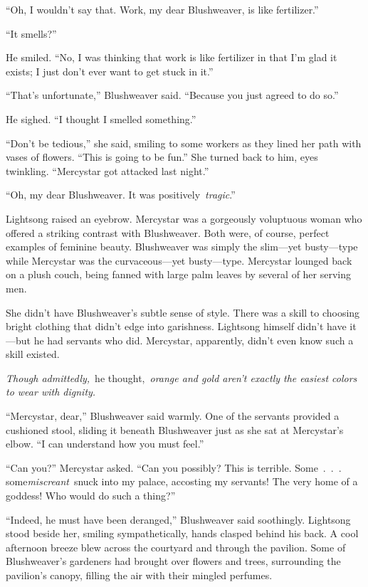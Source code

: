 “Oh, I wouldn’t say that. Work, my dear Blushweaver, is like fertilizer.”

“It smells?”

He smiled. “No, I was thinking that work is like fertilizer in that I’m glad it exists; I just don’t ever want to get stuck in it.”

“That’s unfortunate,” Blushweaver said. “Because you just agreed to do so.”

He sighed. “I thought I smelled something.”

“Don’t be tedious,” she said, smiling to some workers as they lined her path with vases of flowers. “This is going to be fun.” She turned back to him, eyes twinkling. “Mercystar got attacked last night.”

\orn

“Oh, my dear Blushweaver. It was positively~\textit{tragic}.”

Lightsong raised an eyebrow. Mercystar was a gorgeously voluptuous woman who offered a striking contrast with Blushweaver. Both were, of course, perfect examples of feminine beauty. Blushweaver was simply the slim—yet busty—type while Mercystar was the curvaceous—yet busty—type. Mercystar lounged back on a plush couch, being fanned with large palm leaves by several of her serving men.

She didn’t have Blushweaver’s subtle sense of style. There was a skill to choosing bright clothing that didn’t edge into garishness. Lightsong himself didn’t have it—but he had servants who did. Mercystar, apparently, didn’t even know such a skill existed.

\textit{Though admittedly,}~he thought,~\textit{orange and gold aren’t exactly the easiest colors to wear with dignity.}

“Mercystar, dear,” Blushweaver said warmly. One of the servants provided a cushioned stool, sliding it beneath Blushweaver just as she sat at Mercystar’s elbow. “I can understand how you must feel.”

“Can you?” Mercystar asked. “Can you possibly? This is terrible. Some~.~.~. some\textit{miscreant}~snuck into my palace, accosting my servants! The very home of a goddess! Who would do such a thing?”

“Indeed, he must have been deranged,” Blushweaver said soothingly. Lightsong stood beside her, smiling sympathetically, hands clasped behind his back. A cool afternoon breeze blew across the courtyard and through the pavilion. Some of Blushweaver’s gardeners had brought over flowers and trees, surrounding the pavilion’s canopy, filling the air with their mingled perfumes.

